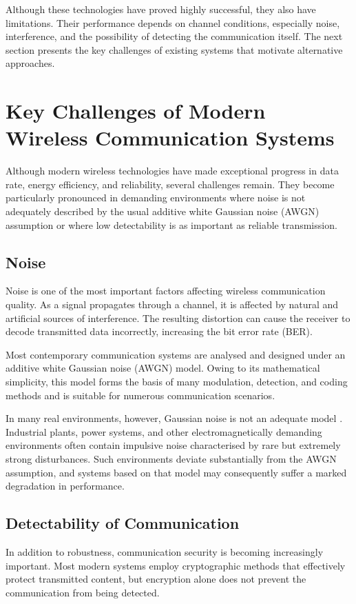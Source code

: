 \documentclass[a4paper, 12pt, openany]{book}
\begin{document}
Although these technologies have proved highly successful, they also have limitations. Their performance depends on channel conditions, especially noise, interference, and the possibility of detecting the communication itself. The next section presents the key challenges of existing systems that motivate alternative approaches.

\section{Key Challenges of Modern Wireless Communication Systems}
Although modern wireless technologies have made exceptional progress in data rate, energy efficiency, and reliability, several challenges remain. They become particularly pronounced in demanding environments where noise is not adequately described by the usual additive white Gaussian noise (AWGN) assumption or where low detectability is as important as reliable transmission.

\subsection{Noise}
Noise is one of the most important factors affecting wireless communication quality. As a signal propagates through a channel, it is affected by natural and artificial sources of interference. The resulting distortion can cause the receiver to decode transmitted data incorrectly, increasing the bit error rate (BER).

Most contemporary communication systems are analysed and designed under an additive white Gaussian noise (AWGN) model. Owing to its mathematical simplicity, this model forms the basis of many modulation, detection, and coding methods and is suitable for numerous communication scenarios\cite{wikiAWGN}\cite{iblAWGN}.

In many real environments, however, Gaussian noise is not an adequate model \cite{madi2011impacts}. Industrial plants, power systems, and other electromagnetically demanding environments often contain impulsive noise characterised by rare but extremely strong disturbances. Such environments deviate substantially from the AWGN assumption, and systems based on that model may consequently suffer a marked degradation in performance.

\subsection{Detectability of Communication}
In addition to robustness, communication security is becoming increasingly important. Most modern systems employ cryptographic methods that effectively protect transmitted content, but encryption alone does not prevent the communication from being detected.
\end{document}
